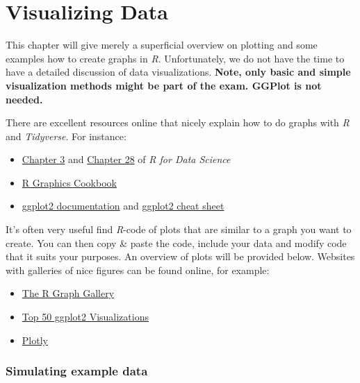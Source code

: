 \documentclass[
]{scrartcl}
\providecommand{\tightlist}{%
  \setlength{\itemsep}{0pt}\setlength{\parskip}{0pt}}
\begin{document}
\section{Visualizing Data}\label{visualizing-data}

This chapter will give merely a superficial overview on plotting and some examples how to create graphs in \emph{R}. Unfortunately, we do not have the time to have a detailed discussion of data visualizations. \textbf{Note, only basic and simple visualization methods might be part of the exam. GGPlot is not needed.}

There are excellent resources online that nicely explain how to do graphs with \emph{R} and \emph{Tidyverse}. For instance:

\begin{itemize}
\tightlist
\item
  \href{http://r4ds.had.co.nz/data-visualisation.html}{Chapter 3} and \href{Chapter\%2028:\%20Graphics\%20for\%20communication}{Chapter 28} of \emph{R for Data Science}
\item
  \href{http://www.cookbook-r.com/Graphs/}{R Graphics Cookbook}
\item
  \href{https://ggplot2.tidyverse.org/reference/}{ggplot2 documentation} and \hyperref[cheatsheets]{ggplot2 cheat sheet}
\end{itemize}

It's often very useful find \emph{R}-code of plots that are similar to a graph you want to create. You can then copy \& paste the code, include your data and modify code that it suits your purposes. An overview of plots will be provided below. Websites with galleries of nice figures can be found online, for example:

\begin{itemize}
\tightlist
\item
  \href{http://www.r-graph-gallery.com/}{The R Graph Gallery}
\item
  \href{http://r-statistics.co/Top50-Ggplot2-Visualizations-MasterList-R-Code.html}{Top 50 ggplot2 Visualizations}
\item
  \href{https://plotly.com/ggplot2/}{Plotly}
\end{itemize}

\subsubsection*{Simulating example data}\label{simulating-example-data}
\end{document}
